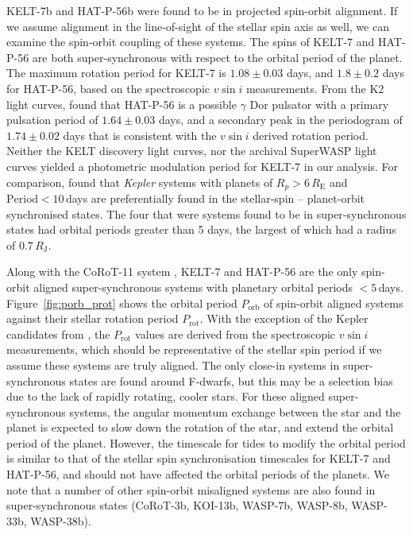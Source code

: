 \documentclass[useAMS,usenatbib]{mn2e}
\begin{document}
KELT-7b and HAT-P-56b were found to be in projected spin-orbit alignment. If we assume alignment in the line-of-sight of the stellar spin axis as well, we can examine the spin-orbit coupling of these systems. The spins of KELT-7 and HAT-P-56 are both super-synchronous with respect to the orbital period of the planet. The maximum rotation period for KELT-7 is $1.08\pm0.03$ days, and $1.8\pm0.2$ days for HAT-P-56, based on the spectroscopic $v \sin i$ measurements. From the K2 light curves, \citet{2015AJ....150...85H} found that HAT-P-56 is a possible $\gamma$ Dor pulsator with a primary pulsation period of $1.64\pm0.03$ days, and a secondary peak in the periodogram of $1.74\pm0.02$ days that is consistent with the $v\sin i$ derived rotation period. Neither the KELT discovery light curves, nor the archival SuperWASP light curves \citep{2010A&amp;A...520L..10B} yielded a photometric modulation period for KELT-7 in our analysis.  For comparison, \citet{2013MNRAS.436.1883W} found that \emph{Kepler} systems with planets of $R_p > 6 \,R_\text{E}$ and $\text{Period}<10$\,days are preferentially found in the stellar-spin -- planet-orbit synchronised states. The four that were systems found to be in super-synchronous states had orbital periods greater than 5 days, the largest of which had a radius of $0.7\,R_\mathrm{J}$. 

Along with the CoRoT-11 system \citep{2010A&amp;A...524A..55G,2012A&amp;A...543L...5G}, KELT-7 and HAT-P-56 are the only spin-orbit aligned super-synchronous systems with planetary orbital periods $<5$\,days. Figure~\ref{fig:porb_prot} shows the orbital period $P_\text{orb}$ of spin-orbit aligned systems against their stellar rotation period $P_\text{rot}$. With the exception of the Kepler candidates from \citet{2013MNRAS.436.1883W}, the $P_\text{rot}$ values are derived from the spectroscopic $v\sin i$ measurements, which should be representative of the stellar spin period if we assume these systems are truly aligned. The only close-in systems in super-synchronous states are found around F-dwarfs, but this may be a selection bias due to the lack of rapidly rotating, cooler stars. For these aligned super-synchronous systems, the angular momentum exchange between the star and the planet is expected to slow down the rotation of the star, and extend the orbital period of the planet. However, the timescale for tides to modify the orbital period is similar to that of the stellar spin synchronisation timescales \citep{2012ApJ...757....6H} for KELT-7 and HAT-P-56, and should not have affected the orbital periods of the planets. We note that a number of other spin-orbit misaligned systems are also found in super-synchronous states (CoRoT-3b, KOI-13b, WASP-7b, WASP-8b, WASP-33b, WASP-38b). 
\end{document}
